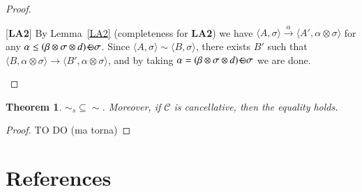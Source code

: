 \documentclass[preprint,12pt]{elsarticle}
\newtheorem{proof}{Proof}
\newtheorem{theorem}{Theorem}
\def\odiv{\, {\ominus\hspace{-7.7pt} \div} \,}
\begin{document}
{\begin{proof}
\begin{description}
		\item{[{\bf LA2}]}
		By Lemma~\ref{LA2} (completeness for {\bf LA2}) we have $\langle A,  \sigma \rangle  \xrightarrow{\alpha}\langle A', \alpha \otimes \sigma \rangle$
		for any $\alpha \leq (\beta \otimes \sigma \otimes d) \odiv \sigma$.
		Since $\langle A,\sigma \rangle \sim \langle B,\sigma \rangle$, 
		there exists $B'$ such that 
		$\langle B, \alpha \otimes \sigma \rangle \xrightarrow{} \langle B', \alpha \otimes \sigma \rangle$,
		and by taking $\alpha = (\beta \otimes \sigma \otimes d) \odiv \sigma$ we are done.
	\end{description}
\end{proof}




\begin{theorem}
	$\sim_{\mathit{s}} \subseteq \sim$. Moreover, if $\mathcal{C}$ is cancellative, then the equality holds.
\end{theorem}
\begin{proof} 
	
	TO DO (ma torna)
\end{proof}
}

\section*{References} \label{}



%
\end{document}
